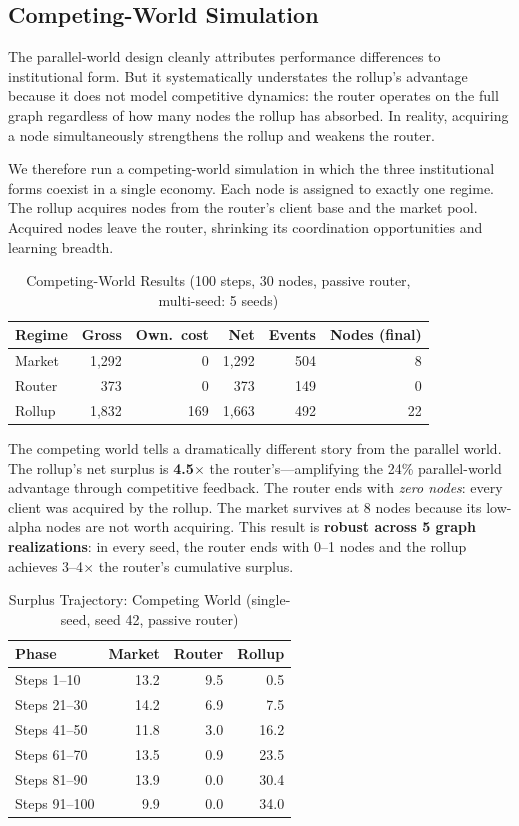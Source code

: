 \documentclass[12pt]{article}
\theoremstyle{definition}
\begin{document}
\subsection{Competing-World Simulation}
\label{sec:competing}

The parallel-world design cleanly attributes performance differences to institutional form. But it systematically understates the rollup's advantage because it does not model competitive dynamics: the router operates on the full graph regardless of how many nodes the rollup has absorbed. In reality, acquiring a node simultaneously strengthens the rollup and weakens the router.

We therefore run a competing-world simulation in which the three institutional forms coexist in a single economy. Each node is assigned to exactly one regime. The rollup acquires nodes from the router's client base and the market pool. Acquired nodes leave the router, shrinking its coordination opportunities and learning breadth.

\begin{table}[H]
\centering
\caption{Competing-World Results (100 steps, 30 nodes, passive router, multi-seed: 5 seeds)}
\label{tab:competing}
\begin{tabular}{lrrrrr}
\toprule
Regime & Gross & Own.\ cost & Net & Events & Nodes (final) \\
\midrule
Market & 1,292 & 0 & 1,292 & 504 & 8 \\
Router & 373 & 0 & 373 & 149 & 0 \\
Rollup & 1,832 & 169 & 1,663 & 492 & 22 \\
\bottomrule
\end{tabular}
\end{table}

The competing world tells a dramatically different story from the parallel world. The rollup's net surplus is \textbf{4.5$\times$} the router's---amplifying the 24\% parallel-world advantage through competitive feedback. The router ends with \textit{zero nodes}: every client was acquired by the rollup. The market survives at 8 nodes because its low-alpha nodes are not worth acquiring. This result is \textbf{robust across 5 graph realizations}: in every seed, the router ends with 0--1 nodes and the rollup achieves 3--4$\times$ the router's cumulative surplus.

\begin{table}[H]
\centering
\caption{Surplus Trajectory: Competing World (single-seed, seed 42, passive router)}
\label{tab:trajectory}
\begin{tabular}{lrrr}
\toprule
Phase & Market & Router & Rollup \\
\midrule
Steps 1--10 & 13.2 & 9.5 & 0.5 \\
Steps 21--30 & 14.2 & 6.9 & 7.5 \\
Steps 41--50 & 11.8 & 3.0 & 16.2 \\
Steps 61--70 & 13.5 & 0.9 & 23.5 \\
Steps 81--90 & 13.9 & 0.0 & 30.4 \\
Steps 91--100 & 9.9 & 0.0 & 34.0 \\
\bottomrule
\end{tabular}
\end{table}
\end{document}
